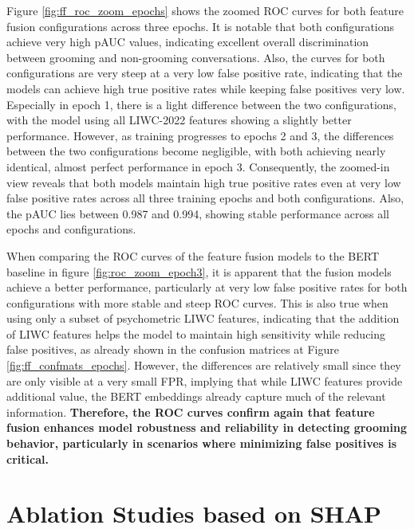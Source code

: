 Figure \ref{fig:ff_roc_zoom_epochs} shows the zoomed ROC curves for both feature fusion configurations across three epochs. It is notable that both configurations achieve very high pAUC values, indicating excellent overall discrimination between grooming and non-grooming conversations. Also, the curves for both configurations are very steep at a very low false positive rate, indicating that the models can achieve high true positive rates while keeping false positives very low. Especially in epoch 1, there is a light difference between the two configurations, with the model using all LIWC-2022 features showing a slightly better performance. However, as training progresses to epochs 2 and 3, the differences between the two configurations become negligible, with both achieving nearly identical, almost perfect performance in epoch 3. Consequently, the zoomed-in view reveals that both models maintain high true positive rates even at very low false positive rates across all three training epochs and both configurations. Also, the pAUC lies between 0.987 and 0.994, showing stable performance across all epochs and configurations.

When comparing the ROC curves of the feature fusion models to the BERT baseline in figure \ref{fig:roc_zoom_epoch3}, it is apparent that the fusion models achieve a  better performance, particularly at very low false positive rates for both configurations with more stable and steep ROC curves. This is also true when using only a subset of psychometric LIWC features, indicating that the addition of LIWC features helps the model to maintain high sensitivity while reducing false positives, as already shown in the confusion matrices at Figure \ref{fig:ff_confmats_epochs}. However, the differences are relatively small since they are only visible at a very small FPR, implying that while LIWC features provide additional value, the BERT embeddings already capture much of the relevant information. \textbf{Therefore, the ROC curves confirm again that feature fusion enhances model robustness and reliability in detecting grooming behavior, particularly in scenarios where minimizing false positives is critical.} 
\section{Ablation Studies based on SHAP} \label{sec:ablation_studies_shap}

